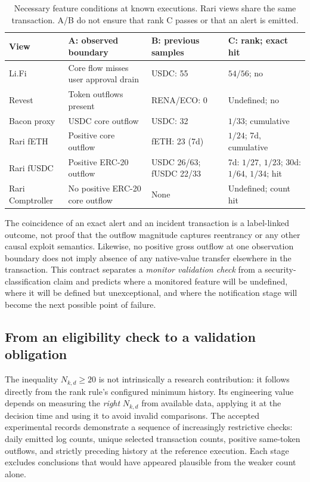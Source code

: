 \documentclass[preprint,12pt,authoryear]{elsarticle}
\begin{document}
\begin{table}[htbp]
\centering\footnotesize
\caption{Necessary feature conditions at known executions. Rari views share the same transaction. A/B do not ensure that rank C passes or that an alert is emitted.}
\label{tab:abc}
\setlength{\tabcolsep}{3pt}
\begin{tabularx}{\linewidth}{p{2.0cm} >{\raggedright\arraybackslash}X p{1.72cm} >{\raggedright\arraybackslash}X}
\toprule
View & A: observed boundary & B: previous samples & C: rank; exact hit \\
\midrule
Li.Fi & Core flow misses user approval drain & USDC: 55 & $54/56$; no \\
Revest & Token outflows present & RENA/ECO: 0 & Undefined; no \\
Bacon proxy & USDC core outflow & USDC: 32 & $1/33$; cumulative \\
Rari fETH & Positive core outflow & fETH: 23 (7d) & $1/24$; 7d, cumulative \\
Rari fUSDC & Positive ERC-20 outflow & USDC 26/63; fUSDC 22/33 & 7d: $1/27$, $1/23$; 30d: $1/64$, $1/34$; hit \\
Rari Comptroller & No positive ERC-20 core outflow & None & Undefined; count hit \\
\bottomrule
\end{tabularx}
\end{table}

The coincidence of an exact alert and an incident transaction is a label-linked outcome, not proof that the outflow magnitude captures reentrancy or any other causal exploit semantics. Likewise, no positive gross outflow at one observation boundary does not imply absence of any native-value transfer elsewhere in the transaction. This contract separates a \emph{monitor validation check} from a security-classification claim and predicts where a monitored feature will be undefined, where it will be defined but unexceptional, and where the notification stage will become the next possible point of failure.

\subsection{From an eligibility check to a validation obligation}
The inequality $N_{k,d}\geq20$ is not intrinsically a research contribution: it follows directly from the rank rule's configured minimum history. Its engineering value depends on measuring the \emph{right} $N_{k,d}$ from available data, applying it at the decision time and using it to avoid invalid comparisons. The accepted experimental records demonstrate a sequence of increasingly restrictive checks: daily emitted log counts, unique selected transaction counts, positive same-token outflows, and strictly preceding history at the reference execution. Each stage excludes conclusions that would have appeared plausible from the weaker count alone.
\end{document}
